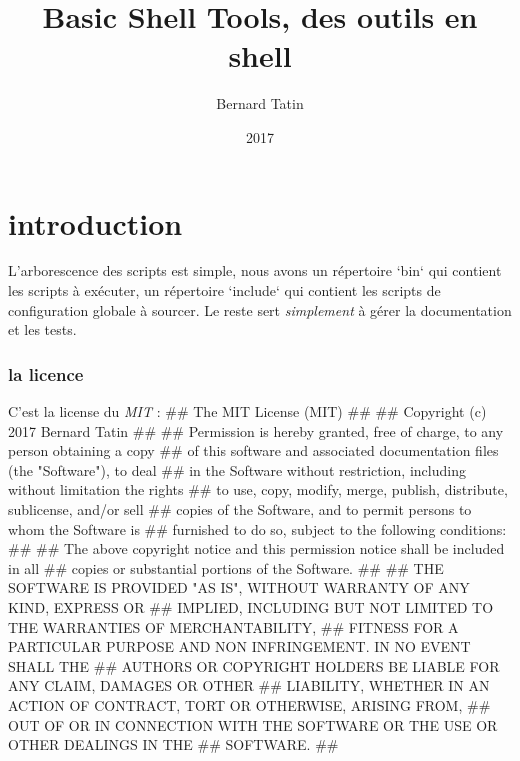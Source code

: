 \documentclass{scrartcl}%
\author{Bernard Tatin}
\date{2017}
\title{Basic Shell Tools, des outils en shell}
\begin{document}
\maketitle
{}

\tableofcontents
\part{introduction}

L'arborescence des scripts est simple, nous avons un répertoire `bin` qui contient les scripts à exécuter, un répertoire `include` qui contient les scripts de configuration globale à sourcer. Le reste sert \emph{simplement} à gérer la documentation et les tests.

\section{la licence}
C'est la license du \emph{MIT} :
\endmoddef\nwstartdeflinemarkup{}\nwenddeflinemarkup
## The MIT License (MIT)
##
## Copyright (c) 2017 Bernard Tatin
##
## Permission is hereby granted, free of charge, to any person obtaining a copy
## of this software and associated documentation files (the "Software"), to deal
## in the Software without restriction, including without limitation the rights
## to use, copy, modify, merge, publish, distribute, sublicense, and/or sell
## copies of the Software, and to permit persons to whom the Software is
## furnished to do so, subject to the following conditions:
##
## The above copyright notice and this permission notice shall be included in all
## copies or substantial portions of the Software.
##
## THE SOFTWARE IS PROVIDED "AS IS", WITHOUT WARRANTY OF ANY KIND, EXPRESS OR
## IMPLIED, INCLUDING BUT NOT LIMITED TO THE WARRANTIES OF MERCHANTABILITY,
## FITNESS FOR A PARTICULAR PURPOSE AND NON INFRINGEMENT. IN NO EVENT SHALL THE
## AUTHORS OR COPYRIGHT HOLDERS BE LIABLE FOR ANY CLAIM, DAMAGES OR OTHER
## LIABILITY, WHETHER IN AN ACTION OF CONTRACT, TORT OR OTHERWISE, ARISING FROM,
## OUT OF OR IN CONNECTION WITH THE SOFTWARE OR THE USE OR OTHER DEALINGS IN THE
## SOFTWARE.
##
\nwendcode{}\nwdocspar
\end{document}
